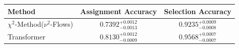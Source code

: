     \begin{tabular}{lcc}
        \toprule
        Method & Assignment Accuracy & Selection Accuracy \\
        \midrule
        $\chi^2$-Method($\nu^2$-Flows) & $0.7392_{-0.0013}^{+0.0012}$ & $0.9235_{-0.0008}^{+0.0009}$ \\
        Transformer & $0.8130_{-0.0009}^{+0.0012}$ & $0.9568_{-0.0007}^{+0.0007}$ \\
        \bottomrule
    \end{tabular}